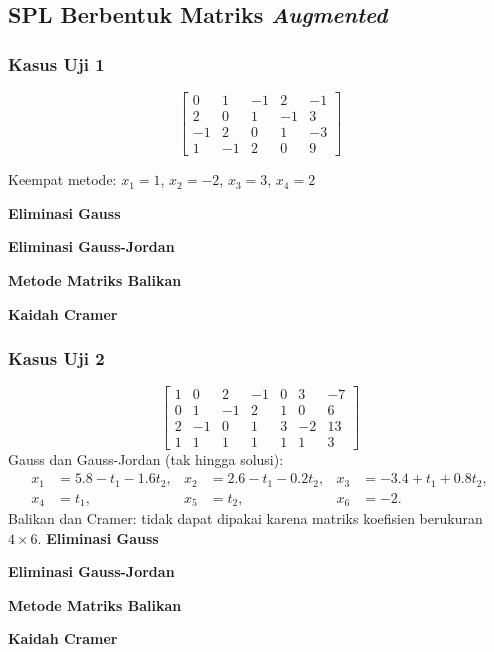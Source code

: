 \subsection{SPL Berbentuk Matriks \textit{Augmented}}

\subsubsection{Kasus Uji 1}
\begin{kasus}
\[
\left[\begin{array}{cccc|c}
0 & 1 & -1 & 2 & -1 \\
2 & 0 & 1 & -1 & 3 \\
-1 & 2 & 0 & 1 & -3 \\
1 & -1 & 2 & 0 & 9
\end{array}\right]
\]
\begin{center}
Keempat metode: $x_1 = 1$, $x_2 = -2$, $x_3 = 3$, $x_4 = 2$
\end{center}
\textbf{Eliminasi Gauss}

\textbf{Eliminasi Gauss-Jordan}

\textbf{Metode Matriks Balikan}

\textbf{Kaidah Cramer}
\end{kasus}

\subsubsection{Kasus Uji 2}
\begin{kasus}
\[
\left[\begin{array}{cccccc|c}
1 & 0 & 2 & -1 & 0 & 3 & -7 \\
0 & 1 & -1 & 2 & 1 & 0 & 6 \\
2 & -1 & 0 & 1 & 3 & -2 & 13 \\
1 & 1 & 1 & 1 & 1 & 1 & 3
\end{array}\right]
\]
Gauss dan Gauss-Jordan (tak hingga solusi):
\begin{align*}
x_1 &= 5.8 - t_1 - 1.6t_2, & x_2 &= 2.6 - t_1 - 0.2t_2, & x_3 &= -3.4 + t_1 + 0.8t_2, \\
x_4 &= t_1, & x_5 &= t_2, & x_6 &= -2 .
\end{align*}
Balikan dan Cramer: tidak dapat dipakai karena matriks koefisien berukuran $4 \times 6$.
\textbf{Eliminasi Gauss}

\textbf{Eliminasi Gauss-Jordan}

\textbf{Metode Matriks Balikan}

\textbf{Kaidah Cramer}
\end{kasus}

